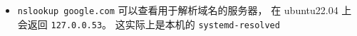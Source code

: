 
\begin{itemize}
\item \verb|nslookup google.com| 可以查看用于解析域名的服务器， 在 ubuntu22.04 上会返回 \verb|127.0.0.53|。 这实际上是本机的 \verb|systemd-resolved|
\end{itemize}

